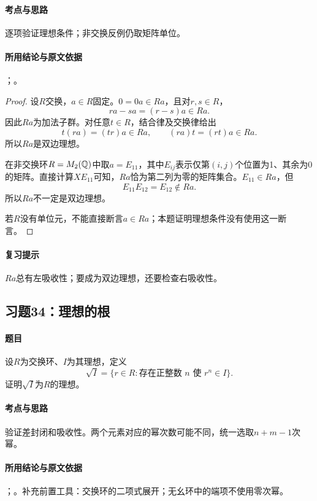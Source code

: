 \paragraph{考点与思路}
逐项验证理想条件；非交换反例仍取矩阵单位。

\paragraph{所用结论与原文依据}
；。


\begin{proof}
设$R$交换，$a\in R$固定。$0=0a\in Ra$，且对$r,s\in R$，
\[
ra-sa=(r-s)a\in Ra.
\]
因此$Ra$为加法子群。对任意$t\in R$，结合律及交换律给出
\[
t(ra)=(tr)a\in Ra,\qquad (ra)t=(rt)a\in Ra.
\]
所以$Ra$是双边理想。

在非交换环$R=M_2(\mathbb Q)$中取$a=E_{11}$，其中$E_{ij}$表示仅第$(i,j)$个位置为1、其余为0的矩阵。直接计算$XE_{11}$可知，$Ra$恰为第二列为零的矩阵集合。$E_{11}\in Ra$，但
\[
E_{11}E_{12}=E_{12}\notin Ra.
\]
所以$Ra$不一定是双边理想。

若$R$没有单位元，不能直接断言$a\in Ra$；本题证明理想条件没有使用这一断言。
\end{proof}

\paragraph{复习提示}
$Ra$总有左吸收性；要成为双边理想，还要检查右吸收性。


\subsection{习题34：\texorpdfstring{理想的根}{理想的根}}
\label{ex:1:34}

\paragraph{题目}
设$R$为交换环、$I$为其理想，定义
\[
\sqrt I=\{r\in R:\text{存在正整数 }n\text{ 使 }r^n\in I\}.
\]
证明$\sqrt I$为$R$的理想。

\paragraph{考点与思路}
验证差封闭和吸收性。两个元素对应的幂次数可能不同，统一选取$n+m-1$次幂。

\paragraph{所用结论与原文依据}
；。补充前置工具：交换环的二项式展开；无幺环中的端项不使用零次幂。

